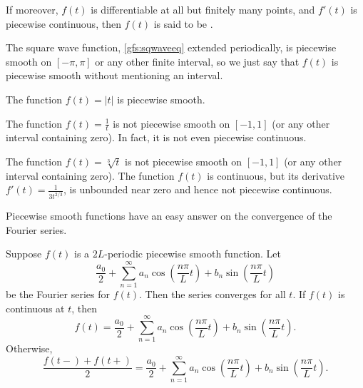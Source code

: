 If moreover, $f(t)$ is differentiable at all but finitely many points,
and $f'(t)$ is piecewise continuous, then 
$f(t)$ is said to be \emph{}.

\begin{example}
The square wave function, \eqref{gfs:sqwaveeq} extended periodically,
is piecewise smooth on $[-\pi,\pi]$ or any other finite interval, so
we just say that $f(t)$ is
piecewise smooth without mentioning an interval.
\end{example}

\begin{example}
The function $f(t) = \lvert t \lvert$
is piecewise smooth.
\end{example}

\begin{example}
The function $f(t) = \frac{1}{t}$ is not piecewise smooth on
$[-1,1]$ (or any other interval containing zero).  In fact, it is not
even piecewise continuous.
\end{example}

\begin{example}
The function $f(t) = \sqrt[3]{t}$ is not piecewise smooth on
$[-1,1]$ (or any other interval containing zero).  
The function $f(t)$ is continuous, but
its derivative $f'(t) = \frac{1}{3t^{2/3}}$, is unbounded near zero and hence not piecewise
continuous.
\end{example}

Piecewise smooth functions have an easy answer on the convergence
of the Fourier series.

\begin{theorem}
Suppose $f(t)$ is a $2L$-periodic piecewise smooth function.
Let
\begin{equation*}
\frac{a_0}{2} + \sum_{n=1}^\infty a_n \cos \left( \frac{n \pi}{L} t
\right)
+ b_n \sin \left( \frac{n \pi}{L} t \right)
\end{equation*}
be the Fourier series for $f(t)$.  Then the series converges
for all $t$.  If $f(t)$ is continuous
at $t$, then
\begin{equation*}
f(t) = \frac{a_0}{2} + \sum_{n=1}^\infty
a_n \cos \left( \frac{n \pi}{L} t \right)
+ b_n \sin \left( \frac{n \pi}{L} t \right) .
\end{equation*}
Otherwise,
\begin{equation*}
\frac{f(t-)+f(t+)}{2} =
\frac{a_0}{2} + \sum_{n=1}^\infty a_n \cos \left( \frac{n \pi}{L}  t
\right)
+ b_n \sin \left( \frac{n \pi}{L} t \right) .
\end{equation*}
\end{theorem}

